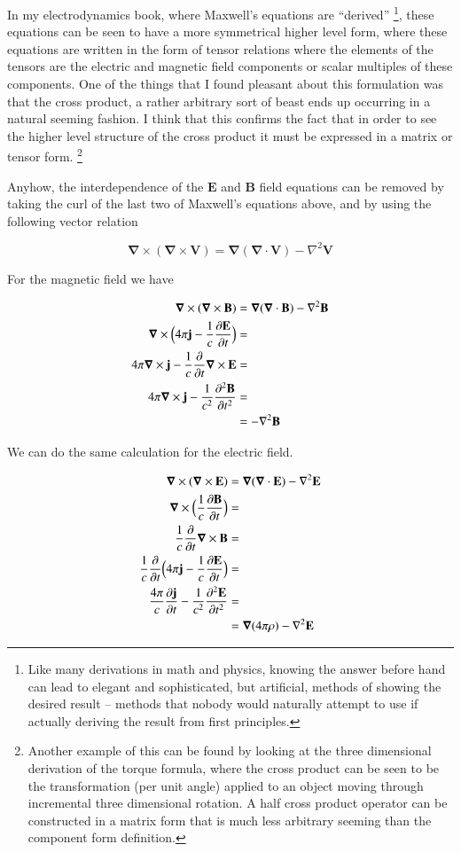 \documentclass{article}      %
\newcommand{\grad}[0]{\boldsymbol{\nabla}}
\newcommand{\curl}[0]{\grad \times}
\newcommand{\diverg}[0]{\grad \cdot}
\newcommand{\delsquared}[0]{\nabla^2}
\newcommand{\D}[2] {\frac {\partial #2} {\partial #1}}
\newcommand{\Dsq}[2] {\frac {\partial^2 #2} {\partial {#1}^2}}
\newcommand{\Bj}[0]{\mathbf{j}}
\newcommand{\BB}[0]{\mathbf{B}}
\newcommand{\BE}[0]{\mathbf{E}}
\newcommand{\BV}[0]{\mathbf{V}}
\begin{document}
In my electrodynamics book, where Maxwell's equations are ``derived''
\footnote
{
Like many derivations in math and physics, knowing the answer before hand
can lead to elegant and sophisticated, but artificial, methods of showing the desired result --
methods that
nobody would naturally attempt to use if actually deriving the result from first principles.
},
these equations can be seen to have a more symmetrical higher level form, where
these equations are written in the form of tensor relations where
the elements of the tensors are the electric and magnetic field components 
or scalar multiples of these components.  One of the things that I found 
pleasant about this formulation was that the cross product, a rather 
arbitrary sort of beast ends up occurring in a natural seeming fashion.  I 
think that this confirms the fact that in order to see the higher level 
structure of the cross product it must be expressed in a matrix or tensor form.
\footnote{
Another example of this can be found by looking at the three dimensional 
derivation of the torque formula, where the 
cross product can be seen to be the transformation (per unit angle)
applied to an object moving through incremental three dimensional 
rotation.  A half cross product operator can be constructed in a matrix form 
that is much less arbitrary seeming than the component form definition.
}

Anyhow, 
the interdependence of the $\BE$ and $\BB$ field equations can be removed by taking the
curl of the last two of Maxwell's equations above, and by using the following
vector relation

\begin{equation*}
\curl (\curl \BV) = \grad (\diverg \BV) - \delsquared \BV
\end{equation*}

For the magnetic field we have

\begin{align*}
\curl (\curl \BB) 			&= \grad (\diverg \BB) - \delsquared \BB \\
\curl \Bigl(4\pi\Bj - \frac{1}{c} \D{t}{\BE} \Bigr) 	&= \\
4\pi\curl \Bj - \frac{1}{c} \D{t}{} \curl \BE 	&= \\
4\pi\curl \Bj - \frac{1}{c^2} \Dsq{t}{\BB} &= \\
      	     				&= - \delsquared \BB
\end{align*}

We can do the same calculation for the electric field.

\begin{align*}
\curl (\curl \BE) &= \grad (\diverg \BE) - \delsquared \BE \\
\curl \Bigl(\frac{1}{c} \D{t}{\BB}\Bigr) &= \\
\frac{1}{c} \D{t}{} \curl \BB &= \\
\frac{1}{c} \D{t}{} \Bigl(4\pi \Bj - \frac{1}{c} \D{t}{\BE} \Bigr) &= \\
\frac{4\pi}{c} \D{t}{\Bj} - \frac{1}{c^2} \Dsq{t}{\BE} &= \\
             &= \grad (4\pi\rho) - \delsquared \BE \\
\end{align*}
\end{document}
